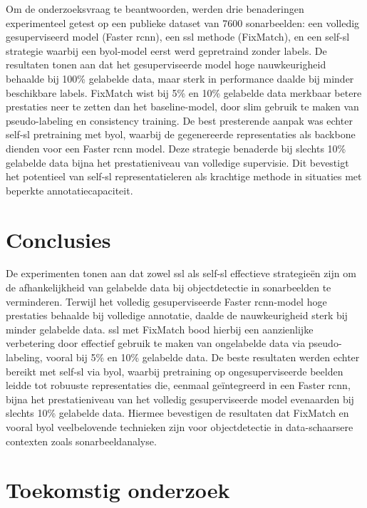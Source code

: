 \documentclass[a0,portrait]{hogent-poster}
\begin{document}
\begin{multicols}{2}
Om de onderzoeksvraag te beantwoorden, werden drie benaderingen experimenteel getest op een publieke dataset van 7600 sonarbeelden: een volledig gesuperviseerd model (Faster \gls{rcnn}), een \gls{ssl} methode (FixMatch), en een \gls{self-sl} strategie waarbij een \gls{byol}-model eerst werd gepretraind zonder labels. De resultaten tonen aan dat het gesuperviseerde model hoge nauwkeurigheid behaalde bij 100\% gelabelde data, maar sterk in performance daalde bij minder beschikbare labels. FixMatch wist bij 5\% en 10\% gelabelde data merkbaar betere prestaties neer te zetten dan het baseline-model, door slim gebruik te maken van pseudo-labeling en consistency training. De best presterende aanpak was echter \gls{self-sl} pretraining met \gls{byol}, waarbij de gegenereerde representaties als backbone dienden voor een Faster \gls{rcnn} model. Deze strategie benaderde bij slechts 10\% gelabelde data bijna het prestatieniveau van volledige supervisie. Dit bevestigt het potentieel van \gls{self-sl} representatieleren als krachtige methode in situaties met beperkte annotatiecapaciteit.

\section{Conclusies}

De experimenten tonen aan dat zowel \gls{ssl} als \gls{self-sl} effectieve strategieën zijn om de afhankelijkheid van gelabelde data bij objectdetectie in sonarbeelden te verminderen. Terwijl het volledig gesuperviseerde Faster \gls{rcnn}-model hoge prestaties behaalde bij volledige annotatie, daalde de nauwkeurigheid sterk bij minder gelabelde data. \gls{ssl} met FixMatch bood hierbij een aanzienlijke verbetering door effectief gebruik te maken van ongelabelde data via pseudo-labeling, vooral bij 5\% en 10\% gelabelde data. De beste resultaten werden echter bereikt met \gls{self-sl} via \gls{byol}, waarbij pretraining op ongesuperviseerde beelden leidde tot robuuste representaties die, eenmaal geïntegreerd in een Faster \gls{rcnn}, bijna het prestatieniveau van het volledig gesuperviseerde model evenaarden bij slechts 10\% gelabelde data. Hiermee bevestigen de resultaten dat FixMatch en vooral \gls{byol} veelbelovende technieken zijn voor objectdetectie in data-schaarsere contexten zoals sonarbeeldanalyse.

\section{Toekomstig onderzoek}


\end{multicols}
\end{document}
